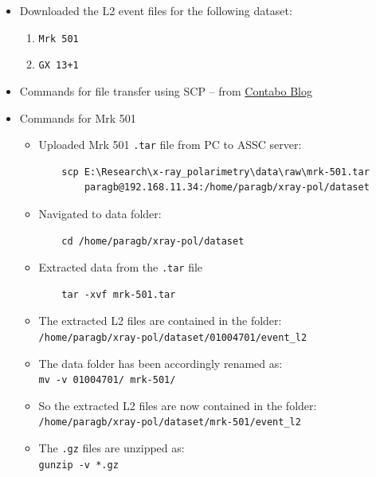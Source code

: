 	\begin{itemize}
		\item Downloaded the L2 event files for the following dataset:
		\begin{enumerate}
			\item \verb|Mrk 501|
			\item \verb|GX 13+1|
		\end{enumerate}
		
		\item Commands for file transfer using SCP -- from \href{https://contabo.com/blog/how-to-transfer-files-using-ssh/}{Contabo Blog}
		\item Commands for Mrk 501
		\begin{itemize}
			\item Uploaded Mrk 501 \verb|.tar| file from PC to ASSC server:
			\begin{verbatim}
	scp E:\Research\x-ray_polarimetry\data\raw\mrk-501.tar
		paragb@192.168.11.34:/home/paragb/xray-pol/dataset
			\end{verbatim}
			
			\item Navigated to data folder:
			\begin{verbatim}
	cd /home/paragb/xray-pol/dataset
			\end{verbatim}
			
			\item Extracted data from the \verb|.tar| file
			\begin{verbatim}
	tar -xvf mrk-501.tar
			\end{verbatim}
			
			\item The extracted L2 files are contained in the folder:\\ \verb|/home/paragb/xray-pol/dataset/01004701/event_l2|
			
			\item The data folder has been accordingly renamed as:\\
			\verb|mv -v 01004701/ mrk-501/|
			
			\item So the extracted L2 files are now contained in the folder:\\
			\verb|/home/paragb/xray-pol/dataset/mrk-501/event_l2|
			
			\item The \verb|.gz| files are unzipped as:\\
			\verb|gunzip -v *.gz|
		\end{itemize}
	\end{itemize}